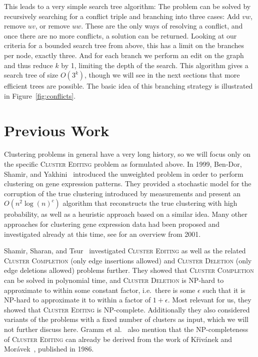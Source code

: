 \documentclass[12pt,oneside,english,parskip=full,headings=small]{scrbook}
\theoremstyle{definition}
\begin{document}
This leads to a very simple search tree algorithm: The problem can be solved by recursively
searching for a conflict triple and branching into three cases: Add $vw$, remove $uv$, or remove
$uw$. These are the only ways of resolving a conflict, and once there are no more conflicts, a
solution can be returned. Looking at our criteria for a bounded search tree from above, this has a
limit on the branches per node, exactly three. And for each branch we perform an edit on the graph
and thus reduce $k$ by 1, limiting the depth of the search. This algorithm gives a search tree of
size $O(3^k)$, though we will see in the next sections that more efficient trees are possible. The
basic idea of this branching strategy is illustrated in Figure~\ref{fig:conflicts}.

\chapter{Previous Work}


Clustering problems in general have a very long history, so we will focus only on the specific
\textsc{Cluster Editing} problem as formulated above. In 1999, Ben-Dor, Shamir, and
Yakhini~\cite{BenDor} introduced the unweighted problem in order to perform clustering on gene
expression patterns. They provided a stochastic model for the corruption of the true clustering
introduced by measurements and present an $O(n^2 \log(n)^c)$ algorithm that reconstructs the true
clustering with high probability, as well as a heuristic approach based on a similar idea. Many
other approaches for clustering gene expression data had been proposed and investigated already at
this time, see \cite{ShamirOverview} for an overview from 2001.

Shamir, Sharan, and Tsur~\cite{ShamirModifications} investigated \textsc{Cluster Editing} as well as
the related \textsc{Cluster Completion} (only edge insertions allowed) and \textsc{Cluster Deletion}
(only edge deletions allowed) problems further. They showed that \textsc{Cluster Completion} can be
solved in polynomial time, and \textsc{Cluster Deletion} is NP-hard to approximate to within some
constant factor, i.e.\ there is some $\epsilon$ such that it is NP-hard to approximate it to within
a factor of $1 + \epsilon$. Most relevant for us, they showed that \textsc{Cluster Editing} is
NP-complete. Additionally they also considered variants of the problems with a fixed number of
clusters as input, which we will not further discuss here. Gramm et al.~\cite{Gramm} also mention
that the NP-completeness of \textsc{Cluster Editing} can already be derived from the work of
Křivánek and Morávek~\cite{Krivanek}, published in 1986.
\end{document}
